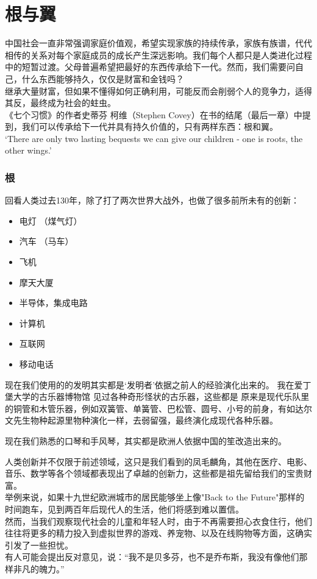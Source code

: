 \chapter{根与翼} %



中国社会一直非常强调家庭价值观，希望实现家族的持续传承，家族有族谱，代代相传的关系对每个家庭成员的成长产生深远影响。我们每个人都只是人类进化过程中的短暂过渡。父母普遍希望把最好的东西传承给下一代。然而，我们需要问自己，什么东西能够持久，仅仅是财富和金钱吗？\\
继承大量财富，但如果不懂得如何正确利用，可能反而会削弱个人的竞争力，适得其反，最终成为社会的蛀虫。\\
《七个习惯》的作者史蒂芬 柯维（Stephen
Covey）在书的结尾（最后一章）中提到，我们可以传承给下一代并具有持久价值的，只有两样东西：根和翼。\\
`There are only two lasting bequests we can give our children - one is
roots, the other wings.'

\hypertarget{ux6839}{%
\subsection{根}\label{ux6839}}

回看人类过去130年，除了打了两次世界大战外，也做了很多前所未有的创新：

\begin{itemize}
\tightlist
\item
  电灯 （煤气灯）
\item
  汽车 （马车）
\item
  飞机
\item
  摩天大厦
\item
  半导体，集成电路
\item
  计算机
\item
  互联网
\item
  移动电话
\end{itemize}

现在我们使用的的发明其实都是‘发明者’依据之前人的经验演化出来的。 我在爱丁堡大学的古乐器博物馆 见过各种奇形怪状的古乐器，这些都是 原来是现代乐队里的铜管和木管乐器，例如双簧管、单簧管、巴松管、圆号、小号的前身，有如达尔文先生物种起源里物种演化一样，去弱留强，最终演化成现代各种乐器。

现在我们熟悉的口琴和手风琴，其实都是欧洲人依据中国的笙改造出来的。 

人类创新并不仅限于前述领域，这只是我们看到的凤毛麟角，其他在医疗、电影、音乐、数学等各个领域都表现出了卓越的创新力，这些都是祖先留给我们的宝贵财富。\\
举例来说，如果十九世纪欧洲城市的居民能够坐上像"Back to the
Future"那样的时间跑车，见到两百年后现代人的生活，他们将感到难以置信。\\
然而，当我们观察现代社会的儿童和年轻人时，由于不再需要担心衣食住行，他们往往将更多的精力投入到虚拟世界的游戏、养宠物、以及在线购物等方面，这确实引发了一些担忧。\\
有人可能会提出反对意见，说：``我不是贝多芬，也不是乔布斯，我没有像他们那样非凡的魄力。''


